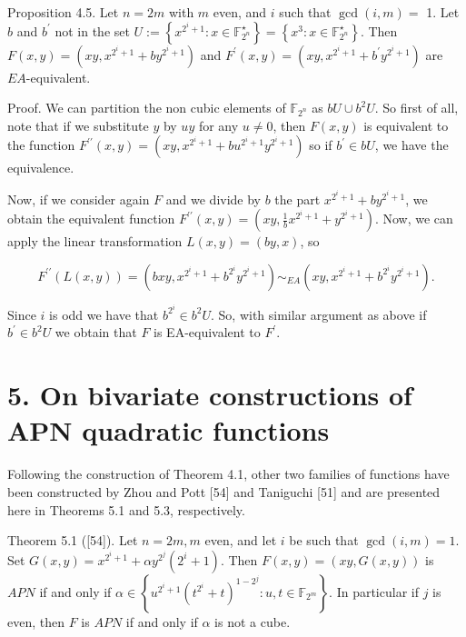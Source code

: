 \documentclass[10pt]{article}
\begin{document}
Proposition 4.5. Let $n=2 m$ with $m$ even, and $i$ such that $\operatorname{gcd}(i, m)=$ 1. Let $b$ and $b^{\prime}$ not in the set $U:=\left\{x^{2^{i}+1}: x \in \mathbb{F}_{2^{n}}^{\star}\right\}=\left\{x^{3}: x \in \mathbb{F}_{2^{n}}^{\star}\right\}$. Then $F(x, y)=\left(x y, x^{2^{i}+1}+b y^{2^{i}+1}\right)$ and $F^{\prime}(x, y)=\left(x y, x^{2^{i}+1}+b^{\prime} y^{2^{i}+1}\right)$ are $E A$-equivalent.

Proof. We can partition the non cubic elements of $\mathbb{F}_{2^{n}}$ as $b U \cup b^{2} U$. So first of all, note that if we substitute $y$ by $u y$ for any $u \neq 0$, then $F(x, y)$ is equivalent to the function $F^{\prime \prime}(x, y)=\left(x y, x^{2^{i}+1}+b u^{2^{i}+1} y^{2^{i}+1}\right)$ so if $b^{\prime} \in b U$, we have the equivalence.

Now, if we consider again $F$ and we divide by $b$ the part $x^{2^{i}+1}+b y^{2^{i}+1}$, we obtain the equivalent function $F^{\prime \prime}(x, y)=\left(x y, \frac{1}{b} x^{2^{i}+1}+y^{2^{i}+1}\right)$. Now, we can apply the linear transformation $L(x, y)=(b y, x)$, so

$$
F^{\prime \prime}(L(x, y))=\left(b x y, x^{2^{i}+1}+b^{2^{i}} y^{2^{i}+1}\right) \sim_{E A}\left(x y, x^{2^{i}+1}+b^{2^{i}} y^{2^{i}+1}\right) .
$$

Since $i$ is odd we have that $b^{2^{i}} \in b^{2} U$. So, with similar argument as above if $b^{\prime} \in b^{2} U$ we obtain that $F$ is EA-equivalent to $F^{\prime}$.

\section*{5. On bivariate constructions of APN quadratic functions}
Following the construction of Theorem 4.1, other two families of functions have been constructed by Zhou and Pott [54] and Taniguchi [51] and are presented here in Theorems 5.1 and 5.3, respectively.

Theorem 5.1 ([54]). Let $n=2 m, m$ even, and let $i$ be such that $\operatorname{gcd}(i, m)=1$. Set $G(x, y)=x^{2^{i}+1}+\alpha y^{2^{j}}\left(2^{i}+1\right)$. Then $F(x, y)=(x y, G(x, y))$ is $A P N$ if and only if $\alpha \in\left\{u^{2^{i}+1}\left(t^{2^{i}}+t\right)^{1-2^{j}}: u, t \in \mathbb{F}_{2^{m}}\right\}$. In particular if $j$ is even, then $F$ is $A P N$ if and only if $\alpha$ is not a cube.
\end{document}
